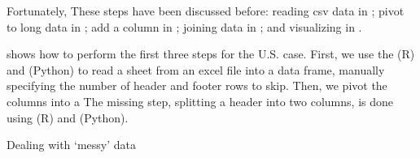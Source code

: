 Fortunately, These steps have been discussed before: reading csv data in ; pivot to long data in ;
add a column in ; joining data in ; and visualizing in .

 shows how to perform the first three steps for the U.S. case.
First, we use the  (R) and  (Python) to read a sheet from an excel file into a data frame,
manually specifying the number of header and footer rows to skip.
Then, we pivot the columns into a
The missing step, splitting a header into two columns, is done using  (R) and  (Python). 

\begin{ccsexample}
  \caption{Dealing with `messy' data}\label{ex:excel}
\end{ccsexample}
